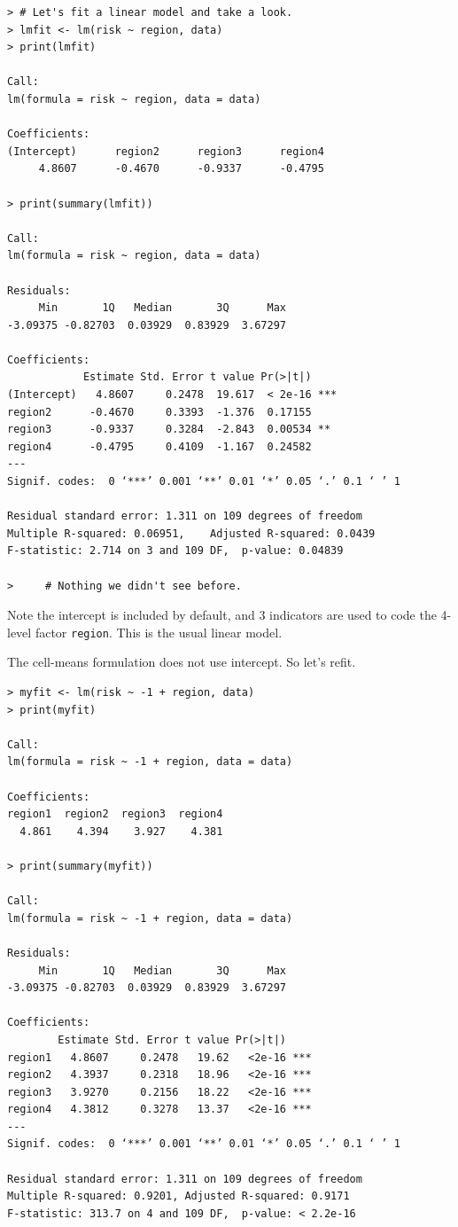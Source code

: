 \documentclass[12pt]{article}
\begin{document}
\begin{verbatim}
> # Let's fit a linear model and take a look.
> lmfit <- lm(risk ~ region, data)
> print(lmfit)

Call:
lm(formula = risk ~ region, data = data)

Coefficients:
(Intercept)      region2      region3      region4  
     4.8607      -0.4670      -0.9337      -0.4795  

> print(summary(lmfit))

Call:
lm(formula = risk ~ region, data = data)

Residuals:
     Min       1Q   Median       3Q      Max 
-3.09375 -0.82703  0.03929  0.83929  3.67297 

Coefficients:
            Estimate Std. Error t value Pr(>|t|)    
(Intercept)   4.8607     0.2478  19.617  < 2e-16 ***
region2      -0.4670     0.3393  -1.376  0.17155    
region3      -0.9337     0.3284  -2.843  0.00534 ** 
region4      -0.4795     0.4109  -1.167  0.24582    
---
Signif. codes:  0 ‘***’ 0.001 ‘**’ 0.01 ‘*’ 0.05 ‘.’ 0.1 ‘ ’ 1 

Residual standard error: 1.311 on 109 degrees of freedom
Multiple R-squared: 0.06951,	Adjusted R-squared: 0.0439 
F-statistic: 2.714 on 3 and 109 DF,  p-value: 0.04839 

>     # Nothing we didn't see before.
\end{verbatim}

Note the intercept is included by default,
and 3 indicators are used to code the 4-level factor \verb+region+.
This is the usual linear model.

The cell-means formulation does not use intercept.
So let's refit.

\begin{verbatim}
> myfit <- lm(risk ~ -1 + region, data)
> print(myfit)

Call:
lm(formula = risk ~ -1 + region, data = data)

Coefficients:
region1  region2  region3  region4  
  4.861    4.394    3.927    4.381  

> print(summary(myfit))

Call:
lm(formula = risk ~ -1 + region, data = data)

Residuals:
     Min       1Q   Median       3Q      Max 
-3.09375 -0.82703  0.03929  0.83929  3.67297 

Coefficients:
        Estimate Std. Error t value Pr(>|t|)    
region1   4.8607     0.2478   19.62   <2e-16 ***
region2   4.3937     0.2318   18.96   <2e-16 ***
region3   3.9270     0.2156   18.22   <2e-16 ***
region4   4.3812     0.3278   13.37   <2e-16 ***
---
Signif. codes:  0 ‘***’ 0.001 ‘**’ 0.01 ‘*’ 0.05 ‘.’ 0.1 ‘ ’ 1 

Residual standard error: 1.311 on 109 degrees of freedom
Multiple R-squared: 0.9201,	Adjusted R-squared: 0.9171 
F-statistic: 313.7 on 4 and 109 DF,  p-value: < 2.2e-16 
\end{verbatim}
\end{document}

